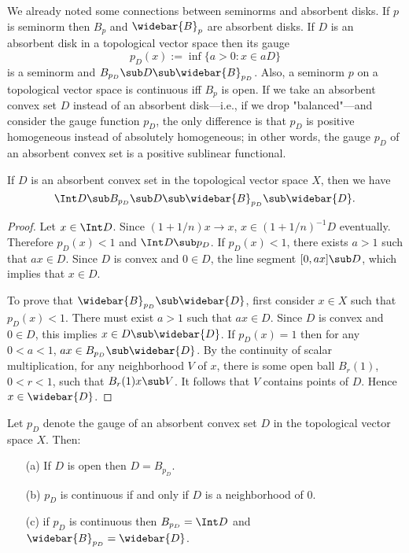We already noted some connections between seminorms and absorbent disks. If $p$ is seminorm then $B_p$ and $\widebar{B}_p$ are absorbent disks. If $D$ is an absorbent disk in a topological vector space then its gauge
\[p_D(x):=\inf\{a>0:x\in aD\}\]
is a seminorm and $B_{p_D}\sub D\sub\widebar{B}_{p_D}$. Also, a seminorm $p$ on a topological vector space is continuous iff $B_p$ is open. If we take an absorbent convex set $D$ instead of an absorbent disk---i.e., if we drop "balanced"---and consider the gauge function $p_D$, the only difference is that $p_D$ is positive homogeneous instead of absolutely homogeneous; in other words, the gauge $p_D$ of an absorbent convex set is a positive sublinear functional.
\begin{proposition}\label{TVS absorbent convex inclusion}
If $D$ is an absorbent convex set in the topological vector space $X$, then we have
\[\Int D\sub B_{p_D}\sub D\sub\widebar{B}_{p_D}\sub\widebar{D}.\]
\end{proposition}
\begin{proof}
Let $x\in\Int D$. Since $(1+1/n)x\to x$, $x\in (1+1/n)^{-1}D$ eventually. Therefore $p_D(x)<1$ and $\Int D\sub p_D$. If $p_D(x)<1$, there exists $a>1$ such that $ax\in D$. Since $D$ is convex and $0\in D$, the line segment $[0,ax]\sub D$, which implies that $x\in D$.\par
To prove that $\widebar{B}_{p_D}\sub\widebar{D}$, first consider $x\in X$ such that $p_D(x)<1$. There must exist $a>1$ such that $ax\in D$. Since $D$ is convex and $0\in D$, this implies $x\in D\sub\widebar{D}$. If $p_D(x)=1$ then for any $0<a<1$, $ax\in B_{p_D}\sub\widebar{D}$. By the continuity of scalar multiplication, for any neighborhood $V$ of $x$, there is some open ball $B_r(1)$, $0<r<1$, such that $B_r(1)x\sub V$. It follows that $V$ contains points of $D$. Hence $x\in\widebar{D}$.
\end{proof}
\begin{proposition}\label{TVS absorbent convex guage prop}
Let $p_D$ denote the gauge of an absorbent convex set $D$ in the topological vector space $X$. Then:
\begin{itemize}
\item[(a)] If $D$ is open then $D=B_{p_D}$.
\item[(b)] $p_D$ is continuous if and only if $D$ is a neighborhood of $0$.
\item[(c)] if $p_D$ is continuous then $B_{p_D}=\Int D$ and $\widebar{B}_{p_D}=\widebar{D}$.
\end{itemize}
\end{proposition}
